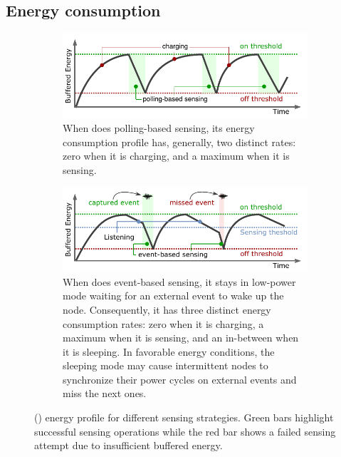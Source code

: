 \subsection{Energy consumption}
%
\begin{figure}[t]
	\centering
		\begin{subfigure}{\columnwidth}
			\includegraphics[width=\columnwidth]{figures/PowerCycleIntermittentSystem}
			\caption{When \sys does polling-based sensing, its energy consumption profile has, generally, two distinct rates: zero when it is charging, and a maximum when it is sensing.}
			\label{fig:pollingBasedSensing}
	\end{subfigure}
	\begin{subfigure}{\columnwidth}
		\includegraphics[width=\columnwidth]{figures/PowerCycleIntermittentSensor}
		\caption{When \sys does event-based sensing, it stays in low-power mode waiting for an external event to wake up the node. Consequently,  it has three distinct energy consumption rates: zero when it is charging, a maximum when it is sensing, and an in-between when it is sleeping. In favorable energy conditions, the sleeping mode may cause intermittent nodes to synchronize their power cycles on external events and miss the next ones.}
		\label{fig:eventBasedSensing}
\end{subfigure}
		\caption{\fullsys (\sys) energy profile for different sensing strategies. Green bars highlight successful sensing operations  while the red bar shows a failed sensing attempt due to insufficient buffered energy.}
		\label{fig:cisPwrCycle}
\end{figure} 

